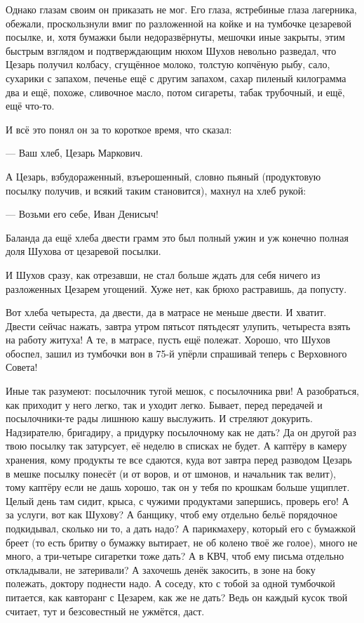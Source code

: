 Однако глазам своим он приказать не мог. Его глаза, ястребиные глаза лагерника, обежали,
проскользнули вмиг по разложенной на койке и на тумбочке цезаревой посылке, и, хотя бумажки
были недоразвёрнуты, мешочки иные закрыты, \dash этим быстрым взглядом и подтверждающим нюхом
Шухов невольно разведал, что Цезарь получил колбасу, сгущённое молоко, толстую копчёную
рыбу, сало, сухарики с запахом, печенье ещё с другим запахом, сахар пиленый килограмма два и
ещё, похоже, сливочное масло, потом сигареты, табак трубочный, и ещё, ещё что-то.

И всё это понял он за то короткое время, что сказал:

--- Ваш хлеб, Цезарь Маркович.

А Цезарь, взбудораженный, взъерошенный, словно пьяный (продуктовую посылку получив, и всякий
таким становится), махнул на хлеб рукой:

--- Возьми его себе, Иван Денисыч!

Баланда да ещё хлеба двести грамм \dash это был полный ужин и уж конечно полная доля Шухова от
цезаревой посылки.

И Шухов сразу, как отрезавши, не стал больше ждать для себя ничего из разложенных Цезарем
угощений. Хуже нет, как брюхо растравишь, да попусту.

Вот хлеба четыреста, да двести, да в матрасе не меньше двести. И хватит. Двести сейчас нажать,
завтра утром пятьсот пятьдесят улупить, четыреста взять на работу \dash житуха! А те, в матрасе,
пусть ещё полежат. Хорошо, что Шухов обоспел, зашил \dash из тумбочки вон в 75-й упёрли \dash
спрашивай теперь с Верховного Совета!

Иные так разумеют: посылочник \dash тугой мешок, с посылочника рви! А разобраться, как приходит у
него легко, так и уходит легко. Бывает, перед передачей и посылочники-те рады лишнюю кашу
выслужить. И стреляют докурить. Надзирателю, бригадиру, \dash а придурку посылочному как не
дать? Да он другой раз твою посылку так затурсует, её неделю в списках не будет. А каптёру в
камеру хранения, кому продукты те все сдаются, куда вот завтра перед разводом Цезарь в мешке
посылку понесёт (и от воров, и от шмонов, и начальник так велит), \dash тому каптёру если не дашь
хорошо, так он у тебя по крошкам больше ущиплет. Целый день там сидит, крыса, с чужими
продуктами запершись, проверь его! А за услуги, вот как Шухову? А банщику, чтоб ему отдельно
бельё порядочное подкидывал, \dash сколько ни то, а дать надо? А парикмахеру, который его с
бумажкой бреет (то есть бритву о бумажку вытирает, не об колено твоё же голое), \dash много не
много, а три-четыре сигаретки тоже дать? А в КВЧ, чтоб ему письма отдельно откладывали, не
затеривали? А захочешь денёк закосить, в зоне на боку полежать, \dash доктору поднести надо. А
соседу, кто с тобой за одной тумбочкой питается, как кавторанг с Цезарем, \dash как же не дать?
Ведь он каждый кусок твой считает, тут и безсовестный не ужмётся, даст.

